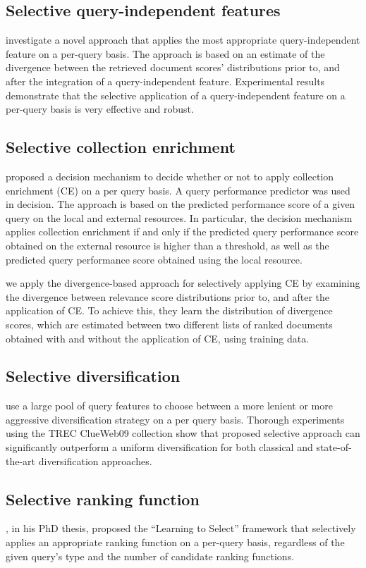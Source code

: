 \subsection{Selective query-independent features}
\citet*{SelectiveQIF} investigate a novel approach that applies the most appropriate query-independent feature on a per-query basis. The approach is based on an estimate of the divergence between the retrieved document scores' distributions prior to, and after the integration of a query-independent feature.  Experimental results demonstrate that the selective application of a query-independent feature on a per-query basis is very effective and robust.

\subsection{Selective collection enrichment}
\citet*{CollectionEnrichment} proposed a decision mechanism to decide whether or not to apply collection enrichment (CE) on a per query basis. A query performance predictor was used in decision. The approach is based on the predicted performance score of a given query on the local and external resources. In particular, the decision mechanism applies collection enrichment if and only if the predicted query performance score obtained on the external resource is higher than a threshold, as well as the predicted query performance score obtained using the local resource.

\citet*{SelCE} we apply the divergence-based approach for selectively applying CE by examining the divergence between relevance score distributions prior to, and after the application of CE.
To achieve this, they learn the distribution of divergence scores, which are estimated between two different lists of ranked documents obtained with and without the application of CE, using training data. 

\subsection{Selective diversification}
\citet*{Diversify} use a large pool of query features to choose between a more lenient or more aggressive diversification strategy on a per query basis.
Thorough experiments using the TREC ClueWeb09 collection show that proposed selective approach can significantly outperform a uniform diversification for both classical and state-of-the-art diversification approaches.

\subsection{Selective ranking function}
\citet*{LTS}, in his PhD thesis, proposed the ``Learning to Select'' framework that selectively applies an appropriate ranking function on a per-query basis, regardless of the given query's type and the number of candidate ranking functions.

